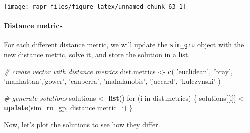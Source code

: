 \documentclass[11pt,]{article}
\newenvironment{Shaded}{\begin{snugshade}}{\end{snugshade}}
\newcommand{\KeywordTok}[1]{\textcolor[rgb]{0.13,0.29,0.53}{\textbf{{#1}}}}
\newcommand{\DataTypeTok}[1]{\textcolor[rgb]{0.13,0.29,0.53}{{#1}}}
\newcommand{\StringTok}[1]{\textcolor[rgb]{0.31,0.60,0.02}{{#1}}}
\newcommand{\CommentTok}[1]{\textcolor[rgb]{0.56,0.35,0.01}{\textit{{#1}}}}
\newcommand{\NormalTok}[1]{{#1}}
\let\origfigure\figure
\let\endorigfigure\endfigure
\renewenvironment{figure}[1][2] {
	\expandafter\origfigure\expandafter[H]
} {
	\endorigfigure
}
\begin{document}
\begin{figure}

{\centering \texttt{[image: rapr\_files/figure-latex/unnamed-chunk-63-1]} 

}

\caption{Distribution of spatial variables across the species' geographic range. These variables each represent a dimension of a three-dimensional attribute space.}\label{fig:unnamed-chunk-63}
\end{figure}

\paragraph{Distance metrics}\label{distance-metrics}

For each different distance metric, we will update the \texttt{sim\_gru}
object with the new distance metric, solve it, and store the solution in
a list.

\begin{Shaded}
\begin{Highlighting}[]
\CommentTok{# create vector with distance metrics}
\NormalTok{dist.metrics <-}\StringTok{ }\KeywordTok{c}\NormalTok{(}
    \StringTok{'euclidean'}\NormalTok{, }\StringTok{'bray'}\NormalTok{, }\StringTok{'manhattan'}\NormalTok{,}\StringTok{'gower'}\NormalTok{,}
    \StringTok{'canberra'}\NormalTok{, }\StringTok{'mahalanobis'}\NormalTok{,}
    \StringTok{'jaccard'}\NormalTok{, }\StringTok{'kulczynski'}
\NormalTok{)}

\CommentTok{# generate solutions}
\NormalTok{solutions <-}\StringTok{ }\KeywordTok{list}\NormalTok{()}
\NormalTok{for (i in dist.metrics) \{}
    \NormalTok{solutions[[i]] <-}\StringTok{ }\KeywordTok{update}\NormalTok{(sim_ru_gp, }\DataTypeTok{distance.metric=}\NormalTok{i)}
\NormalTok{\}}
\end{Highlighting}
\end{Shaded}

Now, let's plot the solutions to see how they differ.
\end{document}
